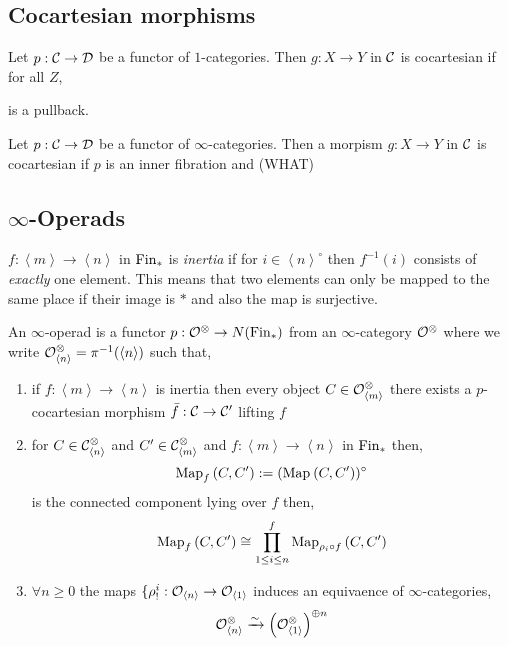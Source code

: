 \documentclass[12pt]{article}
\begin{document}
\subsection{Cocartesian morphisms}

\begin{defn}
Let $p : \mathcal{C} \to \mathcal{D}$ be a functor of $1$-categories. Then $g : X \to Y$ in $\mathcal{C}$ is cocartesian if for all $Z$,
\begin{center}
\end{center}
is a pullback. 
\end{defn}

\begin{defn}
Let $p : \mathcal{C} \to \mathcal{D}$ be a functor of $\infty$-categories. Then a morpism $g : X \to Y$ in $\mathcal{C}$ is cocartesian if $p$ is an inner fibration and (WHAT)
\end{defn}


\subsection{$\infty$-Operads}

\begin{defn}
$f : \left< m \right> \to \left< n \right>$ in $\mathrm{Fin}_*$ is \textit{inertia} if for $i \in \left< n \right>^\circ$ then $f^{-1}(i)$ consists of \textit{exactly} one element. This means that two elements can only be mapped to the same place if their image is $*$ and also the map is surjective.
\end{defn}

\begin{defn}
An $\infty$-operad is a functor $p : \mathcal{O}^\otimes \to N(\mathrm{Fin}_*)$ from an $\infty$-category $\mathcal{O}^\otimes$ where we write $\mathcal{O}^{\otimes}_{\left< n \right>} = \pi^{-1}(\left< n \right>)$ such that,
\begin{enumerate}
\item if $f : \left< m \right> \to \left< n \right>$ is inertia then every object $C \in \mathcal{O}^{\otimes}_{\left< m \right>}$ there exists a $p$-cocartesian morphism $\bar{f} : \mathcal{C} \to \mathcal{C}'$ lifting $f$

\item for $C \in \mathcal{C}^{\otimes}_{\left< n \right>}$ and $C' \in \mathcal{C}^{\otimes}_{\left< m \right>}$ and $f : \left< m \right> \to \left< n \right>$ in $\mathrm{Fin}_*$ then,
\[ \mathrm{Map}_{f}\left(C, C'\right) := (\mathrm{Map}_{}\left(C, C'\right))^\circ \]
is the connected component lying over $f$ then,
\[ \mathrm{Map}_{f}\left(C, C'\right) \cong \prod_{1 \le i \le n}^f \mathrm{Map}_{\rho_i \circ f}\left(C, C'\right) \]
\item $\forall n \ge 0$ the maps $\{ \rho^i_! : \mathcal{O}_{\left< n \right>} \to \mathcal{O}_{\left< 1 \right>}$ induces an equivaence of $\infty$-categories,
\[ \mathcal{O}_{\left< n \right>}^{\otimes} \xrightarrow{\sim} \left( \mathcal{O}_{\left< 1 \right>}^\otimes \right)^{\oplus n} \]
\end{enumerate}
\end{defn}
\end{document}
